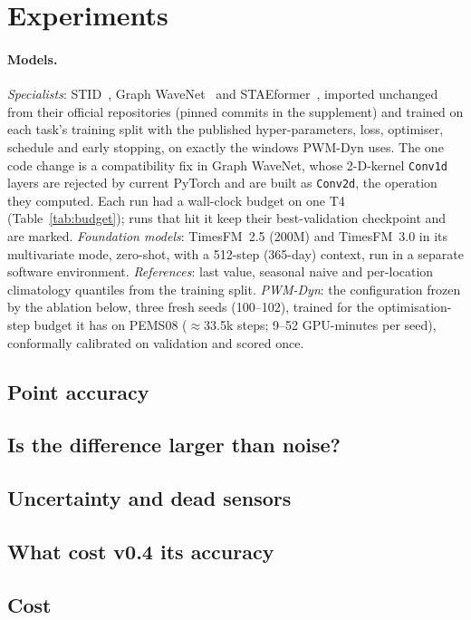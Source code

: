 \section{Experiments}
\label{sec:exp}

\paragraph{Models.} \emph{Specialists}: STID~\citep{shao2022stid}, Graph WaveNet~\citep{wu2019graphwavenet} and
STAEformer~\citep{liu2023staeformer}, imported unchanged from their official repositories (pinned commits in the
supplement) and trained on each task's training split with the published hyper-parameters, loss, optimiser,
schedule and early stopping, on exactly the windows PWM-Dyn uses. The one code change is a compatibility fix in Graph
WaveNet, whose 2-D-kernel \texttt{Conv1d} layers are rejected by current PyTorch and are built as \texttt{Conv2d}, the
operation they computed. Each run had a wall-clock budget on one T4 (Table~\ref{tab:budget}); runs that hit it keep
their best-validation checkpoint and are marked. \emph{Foundation models}: TimesFM~2.5 (200M) and TimesFM~3.0 in its
multivariate mode, zero-shot, with a 512-step (365-day) context, run in a separate software environment.
\emph{References}: last value, seasonal naive and per-location climatology quantiles from the training split.
\emph{PWM-Dyn}: the configuration frozen by the ablation below, three fresh seeds (100--102), trained for the
optimisation-step budget it has on PEMS08 ($\approx$33.5k steps; 9--52 GPU-minutes per seed), conformally
calibrated on validation and scored once.



\subsection{Point accuracy}


\subsection{Is the difference larger than noise?}



\subsection{Uncertainty and dead sensors}



\subsection{What cost v0.4 its accuracy}



\subsection{Cost}

